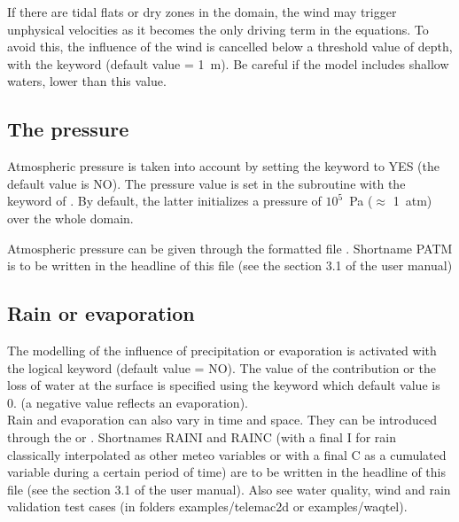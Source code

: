 If there are tidal flats or dry zones in the domain, the wind may trigger
unphysical velocities as it becomes the only driving term in the equations.
To avoid this, the influence of the wind is cancelled below a threshold value
of depth, with the keyword 
(default value = 1~m).
Be careful if the model includes shallow waters, lower than this value.





\subsection{The pressure}

Atmospheric pressure is taken into account by setting the keyword
 to YES (the default value is NO).
The pressure value is set in the  subroutine
with the keyword of .
By default, the latter initializes a pressure of $10^5$~Pa ($\approx$ 1~atm) over
the whole domain.

Atmospheric pressure can be given through the formatted file
.
Shortname PATM is to be written in the headline of this file (see the section 3.1
of the \waqtel user manual)

\subsection{Rain or evaporation}

The modelling of the influence of precipitation or evaporation is activated
with the logical keyword  (default value = NO).
The value of the
contribution or the loss of water at the surface is specified using the keyword
 which default value is 0. (a
negative value reflects an evaporation).\\

Rain and evaporation can also vary in time and space.
They can be introduced through the 
or .
Shortnames RAINI and RAINC (with a final I for rain classically interpolated as
other meteo variables or with a final C as a cumulated variable during a certain
period of time) are to be written in the headline of this file (see the section
3.1 of the \waqtel user manual).
Also see water quality, wind and rain validation test cases (in folders
examples/telemac2d or examples/waqtel).\\

